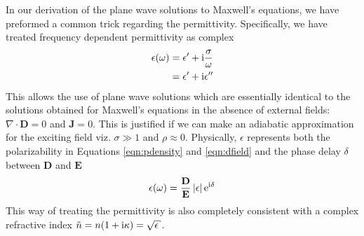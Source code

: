 In our derivation of the plane wave solutions to Maxwell's equations, we
have preformed a common trick regarding the permittivity.
Specifically, we have treated frequency dependent permittivity as complex
\begin{align}
 \epsilon(\omega) &= \epsilon^\prime + {\mathrm{i}} \frac{\sigma}{\omega}\\
                   &= \epsilon^\prime + {\mathrm{i}}\epsilon^{\prime\prime}
\end{align}
This allows the use of plane wave solutions which are essentially identical
to the solutions obtained for Maxwell's equations in the absence of
external fields: $\nabla \cdot \mathbf{D} = 0$ and $\mathbf{J} = 0$.  This
is justified if we can make an adiabatic approximation for the exciting
field viz. $\sigma\gg1$ and $\rho\approx 0$. 
Physically, $\epsilon$ represents
both the polarizability in Equations \ref{eqn:pdensity} and
\ref{eqn:dfield} and the phase delay $\delta$ between $\mathbf{D}$ and
$\mathbf{E}$
\begin{equation}
 \epsilon(\omega) = \frac{\mathbf{D}}{\mathbf{E}} \,|\epsilon| \,{\mathrm{e}}^{{\mathrm{i}} \delta}
\end{equation}
This way of treating the permittivity is also completely consistent with a complex
refractive index $\tilde{n} = n(1+\mi \kappa) = \sqrt{\epsilon}$.

